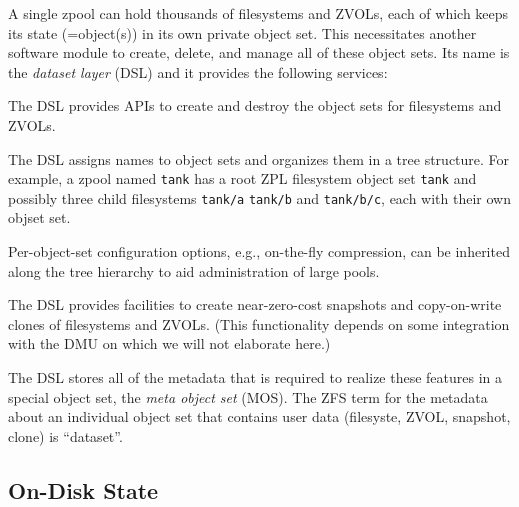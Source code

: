 \documentclass[12pt,a4paper,twoside]{book}
\begin{document}
A single zpool can hold thousands of filesystems and ZVOLs, each of which keeps its state (=object(s)) in its own private object set.
This necessitates another software module to create, delete, and manage all of these object sets.
Its name is the \textit{dataset layer} (DSL) and it provides the following services:
\begin{description}[noitemsep,leftmargin=1.5cm,labelindent=1cm]
    \item[Creation \& Destruction Of Object Sets] The DSL provides APIs to create and destroy the object sets for filesystems and ZVOLs.
    \item[Naming \& Hierachical Organization Of Object Sets] The DSL assigns names to object sets and organizes them in a tree structure.
        For example, a zpool named \lstinline{tank} has a root ZPL filesystem object set \lstinline{tank} and possibly three child filesystems \lstinline{tank/a} \lstinline{tank/b} and \lstinline{tank/b/c}, each with their own objset set.
    \item[Properties \& Inheritance] Per-object-set configuration options, e.g., on-the-fly compression, can be inherited along the tree hierarchy to aid administration of large pools.
    \item[Snapshots \& Clones] The DSL provides facilities to create near-zero-cost snapshots and copy-on-write clones of filesystems and ZVOLs.
        (This functionality depends on some integration with the DMU on which we will not elaborate here.)
\end{description}
The DSL stores all of the metadata that is required to realize these features in a special object set, the \textit{meta object set} (MOS).
The ZFS term for the metadata about an individual object set that contains user data (filesyste, ZVOL, snapshot, clone) is ``dataset''.

\subsection{On-Disk State}\label{sec:openzfs_background:ondiskstate}
\end{document}
